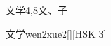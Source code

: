 \begin{entry}{文学}{4,8}{⽂、⼦}
  \begin{phonetics}{文学}{wen2xue2}[][HSK 3]
  \end{phonetics}
\end{entry}
